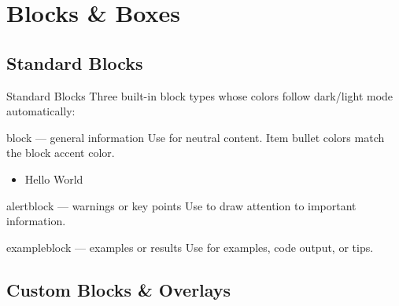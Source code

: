 \documentclass[presentation, aspectratio=169]{beamer}
\begin{document}
\section{Blocks \& Boxes}

\subsection{Standard Blocks}

\begin{frame}{Standard Blocks}
  Three built-in block types whose colors follow dark/light mode automatically:

  \vspace{0.3em}
  \begin{block}{block --- general information}
    Use for neutral content. Item bullet colors match the block accent color.
    \begin{itemize}
      \item Hello World
    \end{itemize}
  \end{block}

  \vspace{0.3em}
  \begin{alertblock}{alertblock --- warnings or key points}
    Use to draw attention to important information.
  \end{alertblock}

  \vspace{0.3em}
  \begin{exampleblock}{exampleblock --- examples or results}
    Use for examples, code output, or tips.
  \end{exampleblock}
\end{frame}

\subsection{Custom Blocks \& Overlays}
\end{document}
